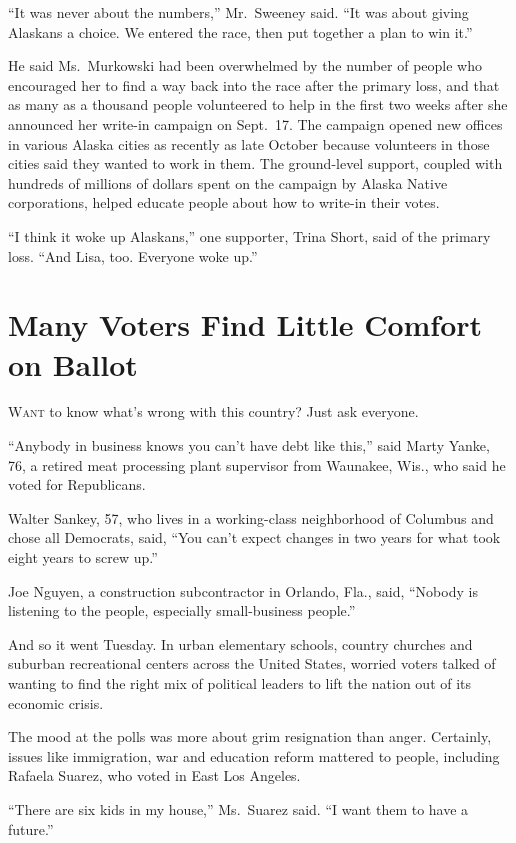 ﻿\documentclass[12pt]{article}
\begin{document}
``It was never about the numbers,'' Mr.~Sweeney said. ``It was about giving Alaskans a choice. We
entered the race, then put together a plan to win it.''

He said Ms.~Murkowski had been overwhelmed by the number of people who encouraged her to find a way
back into the race after the primary loss, and that as many as a thousand people volunteered to help
in the first two weeks after she announced her write-in campaign on Sept.~17. The campaign opened
new offices in various Alaska cities as recently as late October because volunteers in those cities
said they wanted to work in them. The ground-level support, coupled with hundreds of millions of
dollars spent on the campaign by Alaska Native corporations, helped educate people about how to
write-in their votes.

``I think it woke up Alaskans,'' one supporter, Trina Short, said of the primary loss. ``And Lisa,
too. Everyone woke up.''

\section{Many Voters Find Little Comfort on Ballot}

\lettrine{W}{ant} to know what's wrong with this country? Just ask everyone.

``Anybody in business knows you can't have debt like this,'' said Marty Yanke, 76, a retired meat
processing plant supervisor from Waunakee, Wis., who said he voted for Republicans.

Walter Sankey, 57, who lives in a working-class neighborhood of Columbus and chose all Democrats,
said, ``You can't expect changes in two years for what took eight years to screw up.''

Joe Nguyen, a construction subcontractor in Orlando, Fla., said, ``Nobody is listening to the
people, especially small-business people.''

And so it went Tuesday. In urban elementary schools, country churches and suburban recreational
centers across the United States, worried voters talked of wanting to find the right mix of
political leaders to lift the nation out of its economic crisis.

The mood at the polls was more about grim resignation than anger. Certainly, issues like
immigration, war and education reform mattered to people, including Rafaela Suarez, who voted in
East Los Angeles.

``There are six kids in my house,'' Ms.~Suarez said. ``I want them to have a future.''
\end{document}
